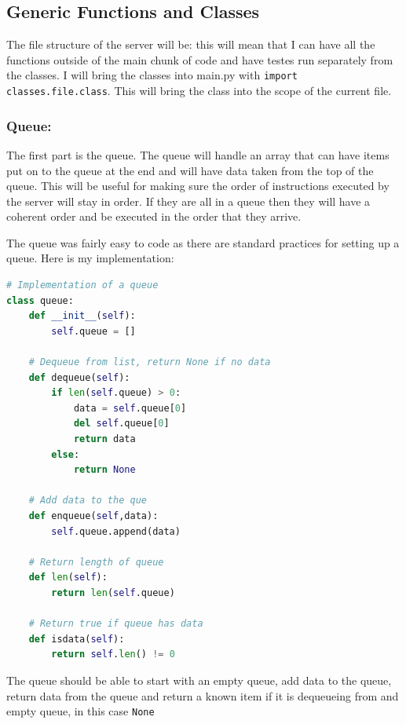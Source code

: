 \documentclass[12pt]{article}
\def\code#1{\texttt{#1}}
\begin{document}
\subsection{Generic Functions and Classes}
The file structure of the server will be:
this will mean that I can have all the functions outside of the main chunk of code and have testes run separately from the classes. I will bring the classes into main.py with \code{import classes.file.class}. This will bring the class into the scope of the current file.

\subsubsection{Queue:}
The first part is the queue. The queue will handle an array that can have items put on to the queue at the end and will have data taken from the top of the queue. This will be useful for making sure the order of instructions executed by the server will stay in order. If they are all in a queue then they will have a coherent order and be executed in the order that they arrive.

The queue was fairly easy to code as there are standard practices for setting up a queue. Here is my implementation:

\begin{lstlisting}[language=Python, caption=Python Server Test]
# Implementation of a queue
class queue:
    def __init__(self):
        self.queue = []

    # Dequeue from list, return None if no data
    def dequeue(self):
        if len(self.queue) > 0:
            data = self.queue[0]
            del self.queue[0]
            return data
        else:
            return None
    
    # Add data to the que
    def enqueue(self,data):
        self.queue.append(data)

    # Return length of queue
    def len(self):
        return len(self.queue)

    # Return true if queue has data
    def isdata(self):
        return self.len() != 0
\end{lstlisting}

The queue should be able to start with an empty queue, add data to the queue, return data from the queue and return a known item if it is dequeueing from and empty queue, in this case \code{None}
\end{document}
